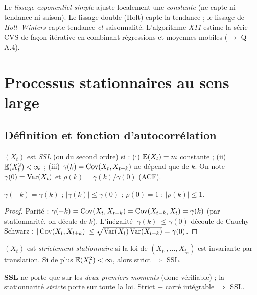 \documentclass[11pt]{report}
\begin{document}
\begin{remarque}
Le \emph{lissage exponentiel simple} ajuste localement une \emph{constante} (ne capte ni
tendance ni saison). Le lissage double (Holt) capte la tendance ; le lissage de
\emph{Holt--Winters} capte tendance \emph{et} saisonnalité. L'algorithme \emph{X11} estime la
série CVS de façon itérative en combinant régressions et moyennes mobiles ($\to$ Q\,A.4).
\end{remarque}

\chapter{Processus stationnaires au sens large}

\section{Définition et fonction d'autocorrélation}
\begin{definition}
$(X_t)$ est \emph{SSL} (ou du second ordre) si :
(i) $\mathbb{E}(X_t)=m$ constante ; (ii) $\mathbb{E}(X_t^2)<\infty$ ;
(iii) $\gamma(k)=\operatorname{Cov}(X_t,X_{t+k})$ ne dépend que de $k$. On note
$\gamma(0)=\operatorname{Var}(X_t)$ et $\rho(k)=\gamma(k)/\gamma(0)$ (ACF).
\end{definition}
\begin{proposition}
$\gamma(-k)=\gamma(k)$ ; $|\gamma(k)|\le\gamma(0)$ ; $\rho(0)=1$ ; $|\rho(k)|\le1$.
\end{proposition}
\begin{proof}
Parité : $\gamma(-k)=\operatorname{Cov}(X_t,X_{t-k})=\operatorname{Cov}(X_{t-k},X_t)=\gamma(k)$ (par stationnarité, on
décale de $k$). L'inégalité $|\gamma(k)|\le\gamma(0)$ découle de Cauchy--Schwarz :
$|\operatorname{Cov}(X_t,X_{t+k})|\le\sqrt{\operatorname{Var}(X_t)\operatorname{Var}(X_{t+k})}=\gamma(0)$.
\end{proof}
\begin{definition}
$(X_t)$ est \emph{strictement stationnaire} si la loi de $(X_{t_1},\dots,X_{t_n})$ est
invariante par translation. Si de plus $\mathbb{E}(X_t^2)<\infty$, alors strict $\Rightarrow$ SSL.
\end{definition}
\begin{recette}[$\to$ Q\,A.15, A.16]
\textbf{SSL} ne porte que sur les \emph{deux premiers moments} (donc vérifiable) ; la
stationnarité \emph{stricte} porte sur toute la loi. Strict $+$ carré intégrable
$\Rightarrow$ SSL.
\end{recette}
\end{document}
